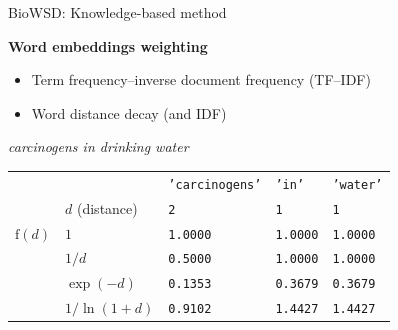 \begin{frame}[t]{BioWSD: Knowledge-based method}

\vspace*{-3mm}
\small
\textbf{Word embeddings weighting}


\footnotesize
\vspace*{-0.4\topsep}
\begin{itemize}
\setlength{\itemsep}{-2.0pt}
\item
Term frequency--inverse document frequency (TF--IDF)
\item
Word distance decay (and IDF)
\end{itemize}

\vspace*{6mm}
\centering
\scriptsize


\begingroup%
\small\textit{carcinogens in \alert{drinking} water}
\endgroup

\vspace*{3mm}

\begin{center}
\renewcommand*{\arraystretch}{0.9}%
\begin{tabular}{llF{30mm}F{30mm}F{30mm}}
& & \texttt{'carcinogens'} & \texttt{'in'} & \texttt{'water'}\\
{}
& $d$ (distance) & \texttt{2} & \texttt{1} & \texttt{1}\\
{}
$\mathrm{f}(d)$ & $1$                       & \texttt{1.0000} & \texttt{1.0000} & \texttt{1.0000}\\
                & $1/d$                     & \texttt{0.5000} & \texttt{1.0000} & \texttt{1.0000}\\
                & $\exp{\left(-d\right)}$   & \texttt{0.1353} & \texttt{0.3679} & \texttt{0.3679}\\
                & $1/\ln{\left(1+d\right)}$ & \texttt{0.9102} & \texttt{1.4427} & \texttt{1.4427}\\
\end{tabular}
\end{center}

\end{frame}
